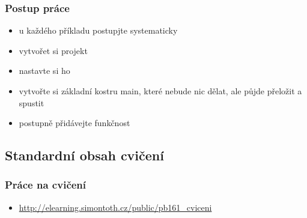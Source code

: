 \begin{frame}
	\frametitle{Postup práce}
	\begin{itemize}
		\item{u každého příkladu postupjte systematicky}
		\item{vytvořet si projekt}
		\item{nastavte si ho}
		\item{vytvořte si základní kostru main, které nebude nic dělat, ale půjde přeložit a spustit}
		\item{postupně přidávejte funkčnost}
	\end{itemize}
\end{frame}

\subsection{Standardní obsah cvičení}

\begin{frame}
	\frametitle{Práce na cvičení}
	\begin{itemize}
		\item{\href{http://elearning.simontoth.cz/public/pb161\_cviceni}{http://elearning.simontoth.cz/public/pb161\_cviceni}}
	\end{itemize}
\end{frame}




